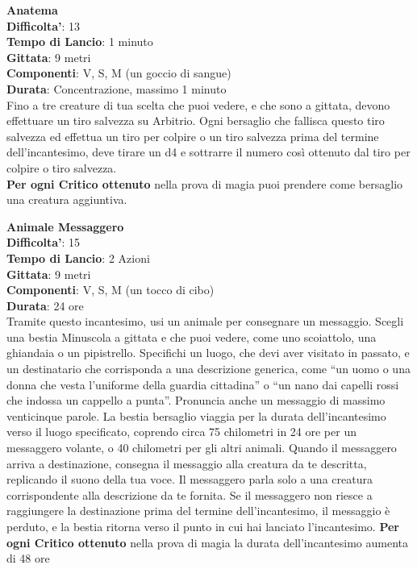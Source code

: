 \begin{multicols}{2}
\medskip\textbf{Anatema}\\
\textbf{Difficolta'}: 13\\
\textbf{Tempo di Lancio}: 1 minuto\\
\textbf{Gittata}: 9 metri\\
\textbf{Componenti}: V, S, M (un goccio di sangue)\\
\textbf{Durata}: Concentrazione, massimo 1 minuto\\
Fino a tre creature di tua scelta che puoi vedere, e che sono a gittata, devono effettuare un tiro salvezza su Arbitrio. Ogni bersaglio che fallisca questo tiro salvezza ed effettua un tiro per colpire o un tiro salvezza prima del termine dell’incantesimo, deve tirare un d4 e sottrarre il numero così ottenuto dal tiro per colpire o tiro salvezza.\\
\textbf{Per ogni Critico ottenuto} nella prova di magia puoi prendere come bersaglio una creatura aggiuntiva.

\medskip\textbf{Animale Messaggero}\\
\textbf{Difficolta'}: 15\\
\textbf{Tempo di Lancio}: 2 Azioni\\
\textbf{Gittata}: 9 metri\\
\textbf{Componenti}: V, S, M (un tocco di cibo)\\
\textbf{Durata}: 24 ore\\
Tramite questo incantesimo, usi un animale per consegnare un messaggio. Scegli una bestia Minuscola a gittata e che puoi vedere, come uno scoiattolo, una ghiandaia o un pipistrello. Specifichi un luogo, che devi aver visitato in passato, e un destinatario che corrisponda a una descrizione generica, come “un uomo o una donna che vesta l’uniforme della guardia cittadina” o “un nano dai capelli rossi che indossa un cappello a punta”. Pronuncia anche un messaggio di massimo venticinque parole. La bestia bersaglio viaggia per la durata dell’incantesimo verso il luogo specificato, coprendo circa 75 chilometri in 24 ore per un messaggero volante, o 40 chilometri per gli altri animali. Quando il messaggero arriva a destinazione, consegna il messaggio alla creatura da te descritta, replicando il suono della tua voce. Il messaggero parla solo a una creatura corrispondente alla descrizione da te fornita. Se il messaggero non riesce a raggiungere la destinazione prima del termine dell’incantesimo, il messaggio è perduto, e la bestia ritorna verso il punto in cui hai lanciato l’incantesimo.
\textbf{Per ogni Critico ottenuto} nella prova di magia la durata dell’incantesimo aumenta di 48 ore


\end{multicols}
